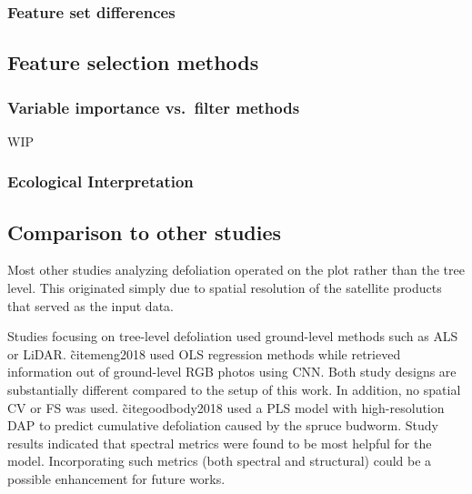 \documentclass[letterpaper, peerreview]{IEEEtran}
\begin{document}
\subsubsection{Feature set differences}

\subsection{Feature selection methods}


\subsubsection{Variable importance vs.\ filter methods}

WIP

\subsubsection{Ecological Interpretation}


\subsection{Comparison to other studies}

\noindent Most other studies analyzing defoliation operated on the plot rather than the tree level.
This originated simply due to spatial resolution of the satellite products that served as the input data\cite{townsend2012, debeurs2008, rengarajan2016}.

Studies focusing on tree-level defoliation used ground-level methods such as \ac{ALS} or \ac{LiDAR}\cite{meng2018, kalin2019}.
\~cite{meng2018} used \ac{OLS} regression methods while\cite{kalin2019} retrieved information out of ground-level RGB photos using \ac{CNN}.
Both study designs are substantially different compared to the setup of this work.
In addition, no spatial \ac{CV} or \ac{FS} was used.
\~cite{goodbody2018} used a \ac{PLS} model with high-resolution \ac{DAP} to predict cumulative defoliation caused by the spruce budworm.
Study results indicated that spectral metrics were found to be most helpful for the model.
Incorporating such metrics (both spectral and structural) could be a possible enhancement for future works.
\end{document}
